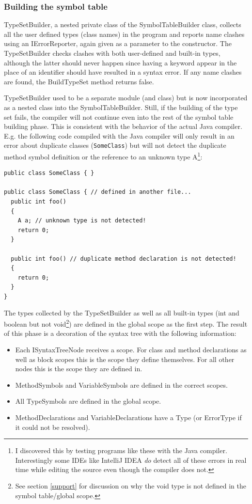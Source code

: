\documentclass[a4paper,11pt]{article}
\begin{document}
\subsubsection{Building the symbol table}

TypeSetBuilder, a nested private class of the SymbolTableBuilder class, collects all the user defined types (class names) in the program and reports name clashes using an IErrorReporter, again given as a parameter to the constructor. The TypeSetBuilder checks clashes with both user-defined and built-in types, although the latter should never happen since having a keyword appear in the place of an identifier should have resulted in a syntax error. If any name clashes are found, the BuildTypeSet method returns false.

TypeSetBuilder used to be a separate module (and class) but is now incorporated as a nested class into the SymbolTableBuilder. Still, if the building of the type set fails, the compiler will not continue even into the rest of the symbol table building phase. This is consistent with the behavior of the actual Java compiler. E.g. the following code compiled with the Java compiler will only result in an error about duplicate classes (\verb,SomeClass,) but will not detect the duplicate method symbol definition or the reference to an unknown type A\footnote{I discovered this by testing programs like these with the Java compiler. Interestingly some IDEs like IntelliJ IDEA \emph{do} detect all of these errors in real time while editing the source even though the compiler does not.}:
\begin{verbatim}
public class SomeClass { }

public class SomeClass { // defined in another file...
  public int foo()
  {
    A a; // unknown type is not detected!
    return 0;
  }

  public int foo() // duplicate method declaration is not detected!
  {
    return 0;
  }
}
\end{verbatim}

The types collected by the TypeSetBuilder as well as all built-in types (int and boolean but not void\footnote{See section \ref{support} for discussion on why the void type is not defined in the symbol table/global scope.}) are defined in the global scope as the first step. The result of this phase is a decoration of the syntax tree with the following information:

\begin{itemize}
    \item Each ISyntaxTreeNode receives a scope. For class and method declarations as well as block scopes this is the scope they define themselves. For all other nodes this is the scope they are defined in.
    \item MethodSymbols and VariableSymbols are defined in the correct scopes.
    \item All TypeSymbols are defined in the global scope.
    \item MethodDeclarations and VariableDeclarations have a Type (or ErrorType if it could not be resolved).
\end{itemize}
\end{document}
